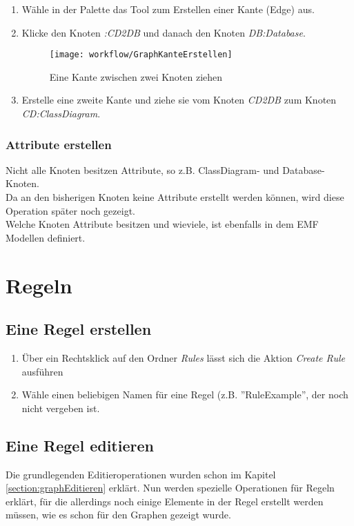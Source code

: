 			\begin{enumerate}
				\item Wähle in der Palette das Tool zum Erstellen einer Kante (Edge) aus.
				
				\item Klicke den Knoten \textit{:CD2DB} und danach den Knoten \textit{DB:Database}.
				
			\begin{figure}[h!]%
				\centering
				\texttt{[image: workflow/GraphKanteErstellen]}
				\caption{Eine Kante zwischen zwei Knoten ziehen}
				\label{fig:graphKanteErstellen}
			\end{figure}				
				
				\item Erstelle eine zweite Kante und ziehe sie vom Knoten \textit{CD2DB} zum Knoten \textit{CD:ClassDiagram}.
				
			\end{enumerate}

			\subsubsection{Attribute erstellen}
			Nicht alle Knoten besitzen Attribute, so z.B. ClassDiagram- und Database-Knoten.\\
			Da an den bisherigen Knoten keine Attribute erstellt werden können, wird diese Operation später noch gezeigt.\\
			Welche Knoten Attribute besitzen und wieviele, ist ebenfalls in dem EMF Modellen definiert.\\
					
	\section{Regeln}
	
	\subsection{Eine Regel erstellen}
	\begin{enumerate}
		\item Über ein Rechtsklick auf den Ordner \textit{Rules} lässt sich die Aktion \textit{Create Rule} ausführen
		\item Wähle einen beliebigen Namen für eine Regel (z.B. ''RuleExample'', der noch nicht vergeben ist.
	\end{enumerate}
	
	\subsection{Eine Regel editieren}
	Die grundlegenden Editieroperationen wurden schon im Kapitel \ref{section:graphEditieren}   erklärt.
	Nun werden spezielle Operationen für Regeln erklärt, für die allerdings noch einige Elemente in der Regel erstellt werden müssen, wie es schon für den Graphen gezeigt wurde.
	
